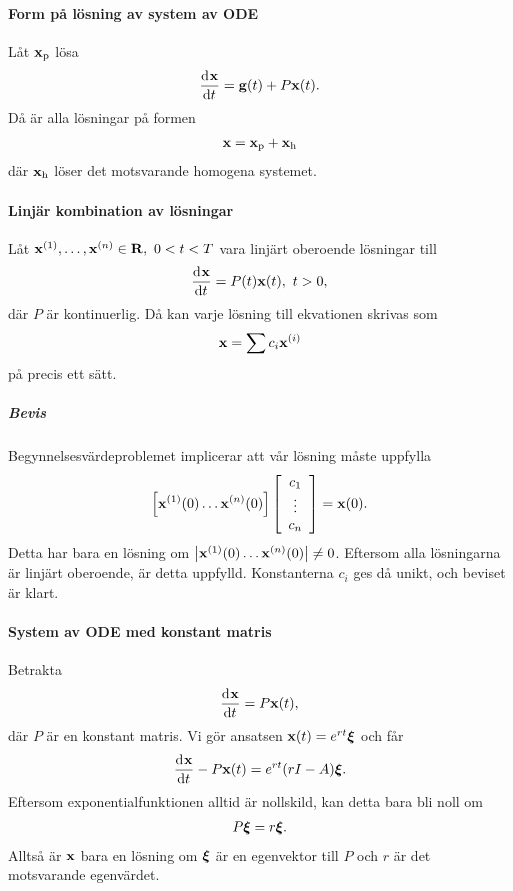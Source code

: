 \paragraph{Form på lösning av system av ODE}
Låt $\vb{x}_{\text{p}}$ lösa
\begin{align*}
	\dv[]{\vb{x}}{t} (t) = \vb{g}(t) + P\vb{x}(t).
\end{align*}
Då är alla lösningar på formen
\begin{align*}
	\vb{x} = \vb{x}_{\text{p}} + \vb{x}_{\text{h}}
\end{align*}
där $\vb{x}_{\text{h}}$ löser det motsvarande homogena systemet.

\paragraph{Linjär kombination av lösningar}
Låt $\vb{x}^{(1)}, \dots, \vb{x}^{(n)}\in\mathbf{R},\ 0 < t < T$ vara linjärt oberoende lösningar till
\begin{align*}
	\dv[]{\vb{x}}{t} (t) = P(t)\vb{x}(t),\ t > 0,
\end{align*}
där $P$ är kontinuerlig. Då kan varje lösning till ekvationen skrivas som
\begin{align*}
	\vb{x} = \sum c_{i}\vb{x}^{(i)}
\end{align*}
på precis ett sätt.

\subparagraph{Bevis}
Begynnelsesvärdeproblemet implicerar att vår lösning måste uppfylla
\begin{align*}
	\left[\vb{x}^{(1)}(0) \dots \vb{x}^{(n)}(0)\right]
	\left[\begin{array}{c}
		c_{1} \\
		\vdots \\
		c_{n}
	\end{array}\right]
	= \vb{x}(0).
\end{align*}
Detta har bara en lösning om $\abs{\vb{x}^{(1)}(0) \dots \vb{x}^{(n)}(0)} \neq 0$. Eftersom alla lösningarna är linjärt oberoende, är detta uppfylld. Konstanterna $c_{i}$ ges då unikt, och beviset är klart.

\paragraph{System av ODE med konstant matris}
Betrakta
\begin{align*}
	\dv[]{\vb{x}}{t} (t) = P\vb{x}(t),
\end{align*}
där $P$ är en konstant matris. Vi gör ansatsen $\vb{x}(t) = e^{rt}\vb*{\xi}$ och får
\begin{align*}
	\dv[]{\vb{x}}{t} (t) - P\vb{x}(t) = e^{rt}(rI - A)\vb*{\xi}.
\end{align*}
Eftersom exponentialfunktionen alltid är nollskild, kan detta bara bli noll om
\begin{align*}
	P\vb*{\xi} = r\vb*{\xi}.
\end{align*}
Alltså är $\vb{x}$ bara en lösning om $\vb*{\xi}$ är en egenvektor till $P$ och $r$ är det motsvarande egenvärdet.